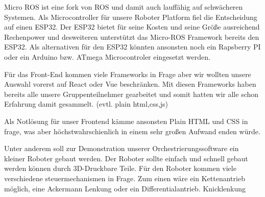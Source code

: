 \begin{flushleft}
    Micro ROS ist eine fork von ROS und damit auch lauffähig auf schwächeren Systemen.
    Als Microcontroller für unsere Roboter Platform fiel die Entscheidung auf einen ESP32.
    Der ESP32 bietet für seine Kosten und seine Größe ausreichend Rechenpower und
    desweiteren unterstützt das Micro-ROS Framework bereits den ESP32.
    Als alternativen für den ESP32 könnten ansonsten noch ein Rapsberry PI oder ein Arduino
    bzw. ATmega Microcontroler eingesetzt werden.

    Für das Front-End kommen viele Frameworks in Frage aber wir wollten unsere Auswahl vorerst auf React oder Vue beschränken.
    Mit diesen Frameworks haben bereits alle unsere Gruppenteilnehmer gearbeitet und somit hatten wir
    alle schon Erfahrung damit gesammelt.
    (evtl. plain html,css,js)

    Als Notlösung für unser Frontend kämme ansonsten Plain HTML und CSS in frage, was aber höchstwahrschienlich
    in einem sehr großen Aufwand enden würde.

    Unter anderem soll zur Demonstration unserer Orchestrierungssoftware ein kleiner Roboter gebaut werden.
    Der Roboter sollte einfach und schnell gebaut werden können durch 3D-Druckbare Teile.
    Für den Roboter kommen viele verschiedene steuermechanismen in Frage.
    Zum einen wäre ein Kettenantrieb möglich, eine Ackermann Lenkung oder ein Differentialantrieb.
    Knicklenkung
    
\end{flushleft}